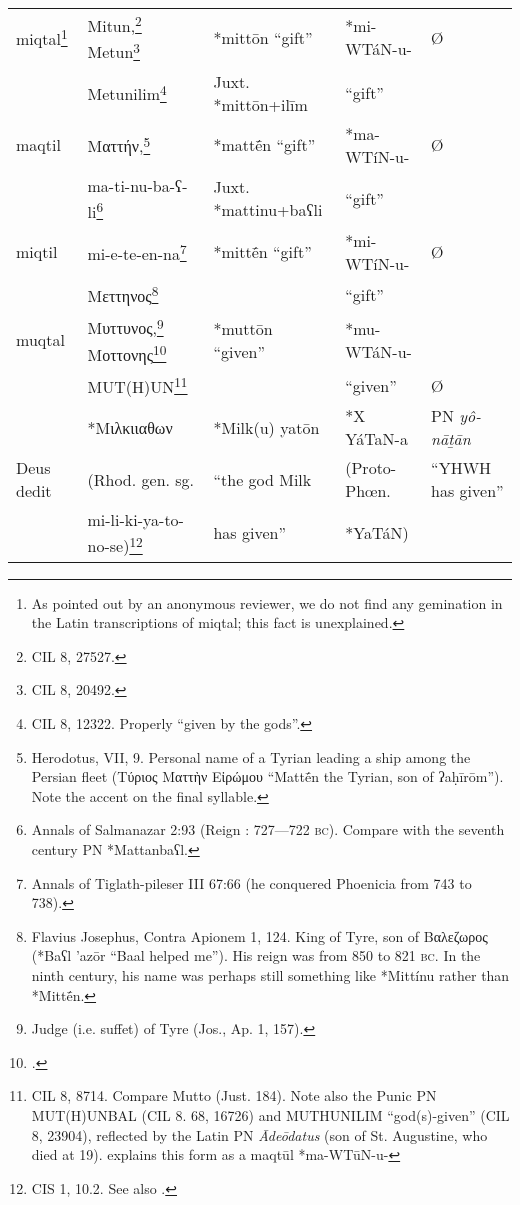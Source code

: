 \documentclass[oldfontcommands,oneside,a4paper,11pt]{article}
\newcommand{\forme}[1]{\textit{#1}}
\newcommand{\grec}[1]{{\mleccha #1}}
\begin{document}
\begin{sloppypar}
\begin{table}
\begin{minipage}{12 cm}
\begin{tabular}{lllll}
miqtal\footnote{As pointed out by an anonymous reviewer, we do not find any gemination in the Latin transcriptions of miqtal; this fact is unexplained.}&	Mitun,\footnote{CIL 8, 27527.} Metun\footnote{CIL 8, 20492.}  &	*mittōn ``gift''&	*mi-WTáN-u-&	Ø\\
&	Metunilim\footnote{CIL 8, 12322. Properly ``given by the gods''.} &	Juxt. *mittōn+ilīm&	``gift''&	\\



maqtil&	\grec{Ματτήν},\footnote{Herodotus, VII, 9. Personal name of a Tyrian leading a ship among the Persian fleet (\grec{Τύριος Ματτὴν Εἰρώμου} ``Mattḗn the Tyrian, son of ʔaḥīrōm''). Note the accent on the final syllable.} &	*mattḗn ``gift''&	*ma-WTíN-u-&	Ø\\
&	ma-ti-nu-ba-ʕ-li\footnote{Annals of Salmanazar 2:93 (Reign : 727—722 \textsc{bc}). Compare with the seventh century PN *Mattanbaʕl.} &	Juxt. *mattinu+baʕli&	``gift''&	\\



miqtil&	mi-e-te-en-na\footnote{Annals of Tiglath-pileser III 67:66 (he conquered Phoenicia from 743 to 738).} &	*mittḗn ``gift''&	*mi-WTíN-u-&	Ø\\
&	\grec{Μεττηνος}\footnote{Flavius Josephus, Contra Apionem 1, 124. King of Tyre, son of \grec{Βαλεζωρος} (*Baʕl 'azōr ``Baal helped me''). His reign was from 850 to 821 \textsc{bc}. In the ninth century, his name was perhaps still something like *Mittínu rather than *Mittḗn.} &	&	``gift''&	\\


muqtal&	\grec{Μυττυνος},\footnote{Judge (i.e. suffet) of Tyre (Jos., Ap. 1, 157).} \grec{Μοττονης}\footnote{\citealt[585, 86]{dittenberger1915}.}  &	*muttōn ``given''&	*mu-WTáN-u-&	\\
&	MUT(H)UN\footnote{CIL 8, 8714. Compare Mutto (Just. 184). Note also the Punic PN MUT(H)UNBAL (CIL 8. 68, 16726)  and MUTHUNILIM ``god(s)-given'' (CIL 8, 23904), reflected by the Latin PN \forme{Ādeōdatus} (son of St. Augustine, who died at 19).  \citet[85]{segert76punic} explains this form as a  maqtūl *ma-WTūN-u-} &	&	``given'' &	Ø\\

&	*\grec{Μιλκιιαθων}&	*Milk(u) yatōn&	*X YáTaN-a&	PN \forme{yô-nāṯān}\\
Deus dedit&	(Rhod. gen. sg. &	``the god Milk &	(Proto-Phœn. &	``YHWH has given''\\
&	mi-li-ki-ya-to-no-se)\footnote{CIS 1, 10.2.  See also \citet[66a, 78c, 132b and 193b]{friedrich51punisch}.} &	has given''&	*YaTáN)&	\\



\end{tabular}
\end{minipage}
\end{table}
\end{sloppypar}
\end{document}
